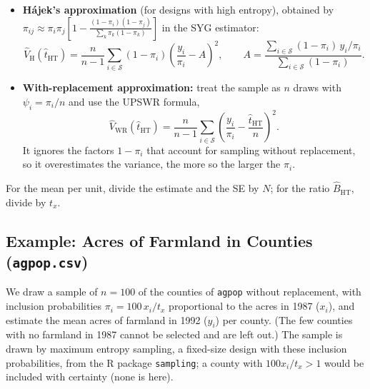 \documentclass[
  letterpaper,
  DIV=11,
  numbers=noendperiod]{scrreprt}
\newcounter{none} %
\renewcommand{\[}{\begin{equation}}
\renewcommand{\]}{\end{equation}}
\begin{document}
\begin{itemize}
\item
  \textbf{Hájek's approximation} (for designs with high entropy),
  obtained by
  \(\pi_{ij}\approx\pi_i\pi_j\left[1-\frac{(1-\pi_i)(1-\pi_j)}{\sum_k\pi_k(1-\pi_k)}\right]\)
  in the SYG estimator: \[
  \hat{V}_{\mathrm{H}}(\hat{t}_{\mathrm{HT}})=\frac{n}{n-1}\sum_{i\in\mathcal{S}}(1-\pi_i)
  \left(\frac{y_i}{\pi_i}-A\right)^2,\qquad
  A=\frac{\sum_{i\in\mathcal{S}}(1-\pi_i)\,y_i/\pi_i}{\sum_{i\in\mathcal{S}}(1-\pi_i)} .
  \]
\item
  \textbf{With-replacement approximation:} treat the sample as \(n\)
  draws with \(\psi_i=\pi_i/n\) and use the UPSWR formula, \[
  \hat{V}_{\mathrm{WR}}(\hat{t}_{\mathrm{HT}})=\frac{n}{n-1}\sum_{i\in\mathcal{S}}\left(\frac{y_i}{\pi_i}-\frac{\hat{t}_{\mathrm{HT}}}{n}\right)^2 .
  \] It ignores the factors \(1-\pi_i\) that account for sampling
  without replacement, so it overestimates the variance, the more so the
  larger the \(\pi_i\).
\end{itemize}

For the mean per unit, divide the estimate and the SE by \(N\); for the
ratio \(\hat{B}_{\mathrm{HT}}\), divide by \(t_x\).

\subsection{\texorpdfstring{Example: Acres of Farmland in Counties
(\texttt{agpop.csv})}{Example: Acres of Farmland in Counties (agpop.csv)}}\label{sec-ups-wo-example}

We draw a sample of \(n=100\) of the counties of \texttt{agpop} without
replacement, with inclusion probabilities \(\pi_i=100\,x_i/t_x\)
proportional to the acres in 1987 (\(x_i\)), and estimate the mean acres
of farmland in 1992 (\(y_i\)) per county. (The few counties with no
farmland in 1987 cannot be selected and are left out.) The sample is
drawn by maximum entropy sampling, a fixed-size design with these
inclusion probabilities, from the R package \texttt{sampling}; a county
with \(100x_i/t_x>1\) would be included with certainty (none is here).
\end{document}
